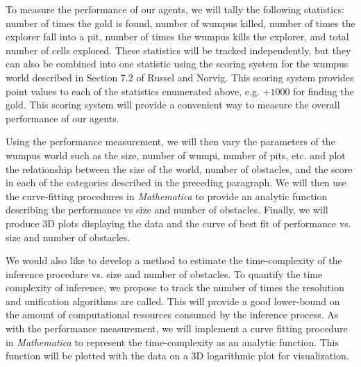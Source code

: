 \documentclass{article}
\begin{document}
	To measure the performance of our agents, we will tally the following statistics: number of times the gold is found, number of wumpus killed, number of times the explorer fall into a pit, number of times the wumpus kills the explorer, and total number of cells explored. These statistics will be tracked independently, but they can also be combined into one statistic using the scoring system for the wumpus world described in Section 7.2 of Russel and Norvig. This scoring system provides point values to each of the statistics enumerated above, e.g. $+1000$ for finding the gold. This scoring system will provide a convenient way to measure the overall performance of our agents.
	
	Using the performance measurement, we will then vary the parameters of the wumpus world such as the size, number of wumpi, number of pits, etc. and plot the relationship between the size of the world, number of obstacles, and the score in each of the categories described in the preceding paragraph. We will then use the curve-fitting procedures in \textit{Mathematica} to provide an analytic function describing the performance vs size and number of obstacles. Finally, we will produce 3D plots displaying the data and the curve of best fit of performance vs. size and number of obstacles.
	
	We would also like to develop a method to estimate the time-complexity of the inference procedure vs. size and number of obstacles.
	To quantify the time complexity of inference, we propose to track the number of times the resolution and unification algorithms are called. This will provide a good lower-bound on the amount of computational resources consumed by the inference process. As with the performance measurement, we will implement a curve fitting procedure in \textit{Mathematica} to represent the time-complexity as an analytic function. This function will be plotted with the data on a 3D logarithmic plot for visualization.
	
	
	

	




		
	
\end{document}
